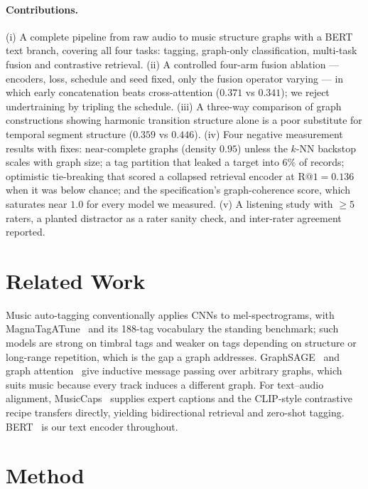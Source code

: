 \documentclass[10pt]{article}
\begin{document}
\paragraph{Contributions.}
(i) A complete pipeline from raw audio to music structure graphs with a BERT
text branch, covering all four tasks: tagging, graph-only classification,
multi-task fusion and contrastive retrieval.
(ii) A controlled four-arm fusion ablation --- encoders, loss, schedule and seed
fixed, only the fusion operator varying --- in which early concatenation beats
cross-attention ($0.371$ vs $0.341$); we reject undertraining by tripling the
schedule.
(iii) A three-way comparison of graph constructions showing harmonic transition
structure alone is a poor substitute for temporal segment structure ($0.359$ vs
$0.446$).
(iv) Four negative measurement results with fixes: near-complete graphs
(density $0.95$) unless the $k$-NN backstop scales with graph size; a tag
partition that leaked a target into $6\%$ of records; optimistic tie-breaking
that scored a collapsed retrieval encoder at $\text{R@}1=0.136$ when it was
below chance; and the specification's graph-coherence score, which saturates
near $1.0$ for every model we measured.
(v) A listening study with $\geq 5$ raters, a planted distractor as a rater
sanity check, and inter-rater agreement reported.

\vspace{-0.3em}
\section{Related Work}

Music auto-tagging conventionally applies CNNs to mel-spectrograms, with
MagnaTagATune~\cite{law2009mtat} and its 188-tag vocabulary the standing
benchmark; such models are strong on timbral tags and weaker on tags depending
on structure or long-range repetition, which is the gap a graph addresses.
GraphSAGE~\cite{hamilton2017graphsage} and graph
attention~\cite{velickovic2018gat} give inductive message passing over arbitrary
graphs, which suits music because every track induces a different graph. For
text--audio alignment, MusicCaps~\cite{agostinelli2023musiclm} supplies expert
captions and the CLIP-style contrastive recipe transfers directly, yielding
bidirectional retrieval and zero-shot tagging. BERT~\cite{devlin2019bert} is our
text encoder throughout.

\vspace{-0.3em}
\section{Method}
\end{document}
